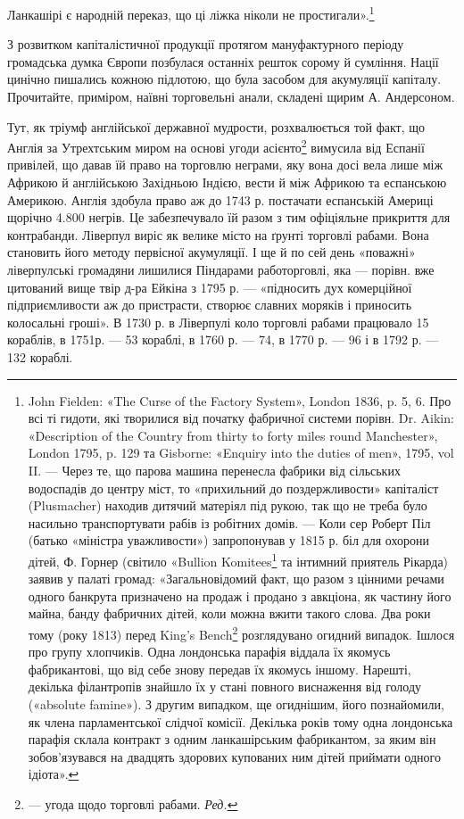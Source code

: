 Ланкашірі є народній переказ, що ці ліжка ніколи не простигали».\footnote{
John Fielden: «The Curse of the Factory System», London 1836, p. 5, 6. Про всі ті гидоти, які
творилися від початку фабричної системи порівн. Dr. Aikin: «Description of the Country from thirty
to forty miles round Manchester», London 1795, p. 129 та Gisborne: «Enquiry into the duties of men»,
1795, vol II. — Через те, що парова машина перенесла
фабрики від сільських водоспадів до центру міст, то «прихильний до поздержливости» капіталіст
(Plusmacher) находив дитячий матеріял під рукою, так що не треба було насильно транспортувати рабів
із робітних домів. — Коли сер Роберт Піл (батько «міністра уважливости») запропонував у 1815 р. біл
для охорони дітей, Ф. Горнер (світило «Bullion Komitees\footnote*{
— комітет у справах зливків. \emph{Ред.}
} та інтимний приятель Рікарда) заявив у палаті громад:
«Загальновідомий факт, що разом з цінними речами одного банкрута
призначено на продаж і продано з авкціона, як частину його майна, банду
фабричних дітей, коли можна вжити такого слова. Два роки тому (року
1813) перед King’s Bench\footnote*{
— найвищим судом. \emph{Ред.}
} розглядувано огидний випадок. Ішлося про
групу хлопчиків. Одна лондонська парафія віддала їх якомусь фабрикантові,
що від себе знову передав їх якомусь іншому. Нарешті, декілька філантропів
знайшло їх у стані повного виснаження від голоду («absolute
famine»). З другим випадком, ще огиднішим, його познайомили, як члена
парламентської слідчої комісії. Декілька років тому одна лондонська
парафія склала контракт з одним ланкашірським фабрикантом, за яким
він зобов’язувався на двадцять здорових купованих ним дітей приймати
одного ідіота».
}

З розвитком капіталістичної продукції протягом мануфактурного
періоду громадська думка Європи позбулася останніх решток
сорому й сумління. Нації цинічно пишались кожною підлотою,
що була засобом для акумуляції капіталу. Прочитайте, приміром,
наївні торговельні анали, складені щирим А. Андерсоном.

Тут, як тріумф англійської державної мудрости, розхвалюється
той факт, що Англія за Утрехтським миром на основі
угоди асієнто\footnote*{
— угода щодо торговлі рабами. \emph{Ред.}
} вимусила від Еспанії привілей, що давав їй
право на торговлю неграми, яку вона досі вела лише між Африкою
й англійською Західньою Індією, вести й між Африкою та
еспанською Америкою. Англія здобула право аж до 1743 р. постачати
еспанській Америці щорічно 4.800 негрів. Це забезпечувало
їй разом з тим офіціяльне прикриття для контрабанди.
Ліверпул виріс як велике місто на ґрунті торговлі рабами.
Вона становить його методу первісної акумуляції. І ще й по сей
день «поважні» ліверпулські громадяни лишилися Піндарами
работорговлі, яка — порівн. вже цитований вище твір д-ра Ейкіна
з 1795 р. — «підносить дух комерційної підприємливости аж до
пристрасти, створює славних моряків і приносить колосальні
гроші». В 1730 р. в Ліверпулі коло торговлі рабами працювало
15 кораблів, в 1751р. — 53 кораблі, в 1760 р. — 74, в 1770 р. —
96 і в 1792 р. — 132 кораблі.

